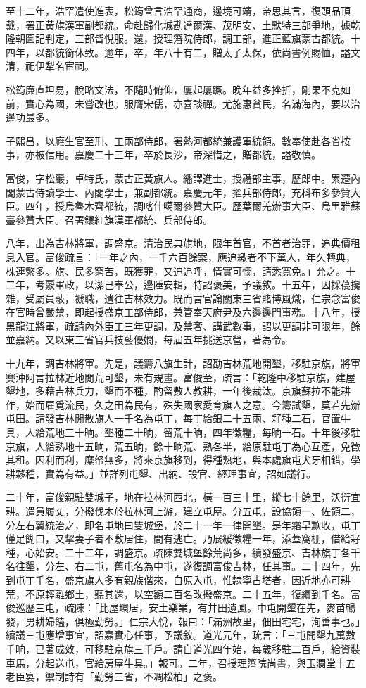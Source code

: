 \begin{pinyinscope}
至十二年，浩罕遣使進表，松筠曾言浩罕通商，邊境可靖，帝思其言，復頭品頂戴，署正黃旗漢軍副都統。命赴歸化城勘達爾漢、茂明安、土默特三部爭地，據乾隆朝圖記判定，三部皆悅服。還，授理籓院侍郎，調工部，進正藍旗蒙古都統。十四年，以都統銜休致。逾年，卒，年八十有二，贈太子太保，依尚書例賜恤，謚文清，祀伊犁名宦祠。

松筠廉直坦易，脫略文法，不隨時俯仰，屢起屢蹶。晚年益多挫折，剛果不克如前，實心為國，未嘗改也。服膺宋儒，亦喜談禪。尤施惠貧民，名滿海內，要以治邊功最多。

子熙昌，以廕生官至刑、工兩部侍郎，署熱河都統兼護軍統領。數奉使赴各省按事，亦被信用。嘉慶二十三年，卒於長沙，帝深惜之，贈都統，謚敬慎。

富俊，字松巖，卓特氏，蒙古正黃旗人。繙譯進士，授禮部主事，歷郎中。累遷內閣蒙古侍讀學士、內閣學士，兼副都統。嘉慶元年，擢兵部侍郎，充科布多參贊大臣。四年，授烏魯木齊都統，調喀什噶爾參贊大臣。歷葉爾羌辦事大臣、烏里雅蘇臺參贊大臣。召署鑲紅旗漢軍都統、兵部侍郎。

八年，出為吉林將軍，調盛京。清治民典旗地，限年首官，不首者治罪，追典價租息入官。富俊疏言：「一年之內，一千六百餘案，應追繳者不下萬人，年久轉典，株連繁多。旗、民多窮苦，既獲罪，又迫追呼，情實可憫，請悉寬免。」允之。十二年，考覈軍政，以潔己奉公，邊陲安輯，特詔褒美，予議敘。十五年，因採葠攙雜，受屬員蔽，褫職，遣往吉林效力。既而言官論關東三省賭博風熾，仁宗念富俊在官時曾嚴禁，即起授盛京工部侍郎，兼管奉天府尹及六邊邊門事務。十八年，授黑龍江將軍，疏請內外臣工三年更調，及禁奢、講武數事，詔以更調非可限年，餘並嘉納。又以東三省官兵技藝優嫺，每屆五年挑送京營，著為令。

十九年，調吉林將軍。先是，議籌八旗生計，詔勘吉林荒地開墾，移駐京旗，將軍賽沖阿言拉林近地閒荒可墾，未有規畫。富俊至，疏言：「乾隆中移駐京旗，建屋墾地，多藉吉林兵力，墾而不種，酌留數人教耕，一年後裁汰。京旗蘇拉不能耕作，始而雇覓流民，久之田為民有，殊失國家愛育旗人之意。今籌試墾，莫若先辦屯田。請發吉林閒散旗人一千名為屯丁，每丁給銀二十五兩、耔種二石，官置牛具，人給荒地三十晌。墾種二十晌，留荒十晌，四年徵糧，每晌一石。十年後移駐京旗，人給熟地十五晌，荒五晌，餘十晌荒、熟各半，給原駐屯丁為心互產，免徵其租。因利而利，糜帑無多，將來京旗移到，得種熟地，與本處旗屯犬牙相錯，學耕夥種，實為有益。」並詳列屯墾、出納、設官、經理事宜，詔如議行。

二十年，富俊親駐雙城子，地在拉林河西北，橫一百三十里，縱七十餘里，沃衍宜耕。遣員履丈，分撥伐木於拉林河上游，建立屯屋。分五屯，設協領一、佐領二，分左右翼統治之，即名屯地曰雙城堡，於二十一年一律開墾。是年霜早歉收，屯丁僅足餬口，又挈妻子者不敷居住，間有逃亡。乃展緩徵糧一年，添蓋窩棚，借給耔種，心始安。二十二年，調盛京。疏陳雙城堡餘荒尚多，續發盛京、吉林旗丁各千名往墾，分左、右二屯，舊屯名為中屯，遂復調富俊吉林，任其事。二十四年，先到屯丁千名，盛京旗人多有親族偕來，自原入屯，惟隸寧古塔者，因近地亦可耕荒，不原輕離鄉土，聽其還，以空額二百名改撥盛京。二十五年，復續到千名。富俊巡歷三屯，疏陳：「比屋環居，安土樂業，有井田遺風。中屯開墾在先，麥苗暢發，男耕婦饁，俱極勤勞。」仁宗大悅，報曰：「滿洲故里，佃田宅宅，洵善事也。」續議三屯應增事宜，詔嘉實心任事，予議敘。道光元年，疏言：「三屯開墾九萬數千晌，已著成效，可移駐京旗三千戶。請自道光四年始，每歲移駐二百戶，給資裝車馬，分起送屯，官給房屋牛具。」報可。二年，召授理籓院尚書，與玉瀾堂十五老臣宴，禦制詩有「勤勞三省，不凋松柏」之褒。


\end{pinyinscope}
